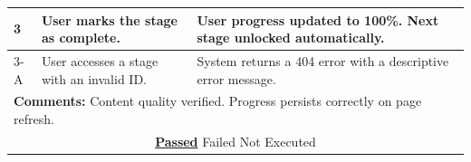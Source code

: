 \documentclass{FastFyp}
\begin{document}
\begin{table}[H]
\begin{tabular}{|p{2.5cm}|p{4cm}|p{2.5cm}|p{4.5cm}|}
3 & User marks the stage as complete. & \multicolumn{2}{p{7cm}|}{User progress updated to 100\%. Next stage unlocked automatically.} \\ \hline
3-A & User accesses a stage with an invalid ID. & \multicolumn{2}{p{7cm}|}{System returns a 404 error with a descriptive error message.} \\ \hline
\multicolumn{4}{|p{13.5cm}|}{\textbf{Comments:} Content quality verified. Progress persists correctly on page refresh.} \\ \hline
\multicolumn{4}{|c|}{\underline{\textbf{Passed}} \quad\quad\quad Failed \quad\quad\quad Not Executed} \\ \hline
\end{tabular}
\end{table}

\vspace{0.5em}
\end{document}
